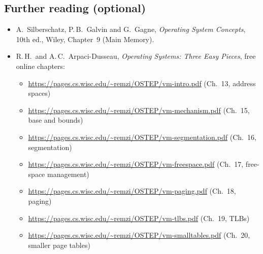 \documentclass[11pt,a4paper]{article}
\begin{document}
\subsection*{Further reading (optional)}
\begin{itemize}
  \item A.\ Silberschatz, P.\,B.\ Galvin and G.\ Gagne, \emph{Operating System Concepts}, 10th ed., Wiley, Chapter~9 (Main Memory).
  \item R.\,H.\ and A.\,C.\ Arpaci-Dusseau, \emph{Operating Systems: Three Easy Pieces}, free online chapters:
  \begin{itemize}
    \item \url{https://pages.cs.wisc.edu/~remzi/OSTEP/vm-intro.pdf} (Ch.~13, address spaces)
    \item \url{https://pages.cs.wisc.edu/~remzi/OSTEP/vm-mechanism.pdf} (Ch.~15, base and bounds)
    \item \url{https://pages.cs.wisc.edu/~remzi/OSTEP/vm-segmentation.pdf} (Ch.~16, segmentation)
    \item \url{https://pages.cs.wisc.edu/~remzi/OSTEP/vm-freespace.pdf} (Ch.~17, free-space management)
    \item \url{https://pages.cs.wisc.edu/~remzi/OSTEP/vm-paging.pdf} (Ch.~18, paging)
    \item \url{https://pages.cs.wisc.edu/~remzi/OSTEP/vm-tlbs.pdf} (Ch.~19, TLBs)
    \item \url{https://pages.cs.wisc.edu/~remzi/OSTEP/vm-smalltables.pdf} (Ch.~20, smaller page tables)
  \end{itemize}
\end{itemize}
\end{document}
